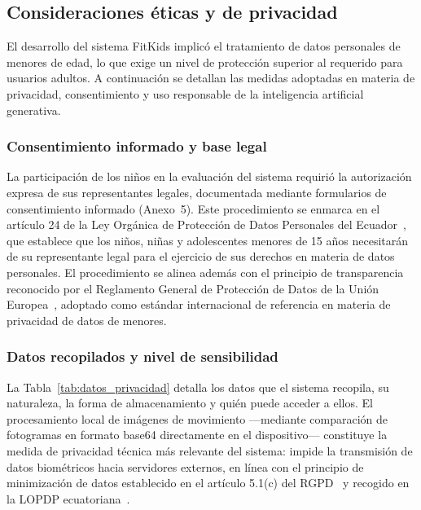			\subsection{Consideraciones éticas y de privacidad}
				El desarrollo del sistema FitKids implicó el tratamiento de datos personales de menores de edad, lo que exige un nivel de protección superior al requerido para usuarios adultos. A continuación se detallan las medidas adoptadas en materia de privacidad, consentimiento y uso responsable de la inteligencia artificial generativa.
				
				\subsubsection{Consentimiento informado y base legal}
					La participación de los niños en la evaluación del sistema requirió la autorización expresa de sus representantes legales, documentada mediante formularios de consentimiento informado (Anexo~5). Este procedimiento se enmarca en el artículo 24 de la Ley Orgánica de Protección de Datos Personales del Ecuador~\cite{LOPDP2021}, que establece que los niños, niñas y adolescentes menores de 15 años necesitarán de su representante legal para el ejercicio de sus derechos en materia de datos personales. El procedimiento se alinea además con el principio de transparencia reconocido por el Reglamento General de Protección de Datos de la Unión Europea~\cite{GDPR2016}, adoptado como estándar internacional de referencia en materia de privacidad de datos de menores.
					
				\subsubsection{Datos recopilados y nivel de sensibilidad}
					La Tabla~\ref{tab:datos_privacidad} detalla los datos que el sistema recopila, su naturaleza, la forma de almacenamiento y quién puede acceder a ellos. El procesamiento local de imágenes de movimiento ---mediante comparación de fotogramas en formato base64 directamente en el dispositivo--- constituye la medida de privacidad técnica más relevante del sistema: impide la transmisión de datos biométricos hacia servidores externos, en línea con el principio de minimización de datos establecido en el artículo 5.1(c) del RGPD~\cite{GDPR2016} y recogido en la LOPDP ecuatoriana~\cite{LOPDP2021}.
					

